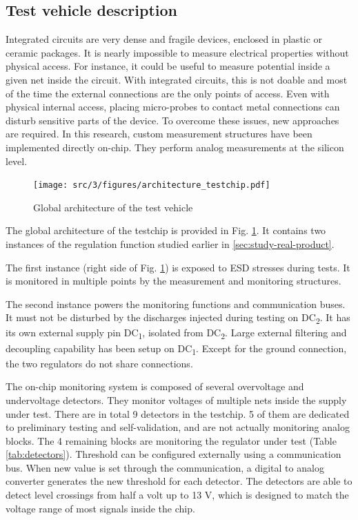 \subsection{Test vehicle description}
\label{sec:test-vehicle-desc}

Integrated circuits are very dense and fragile devices, enclosed in plastic or ceramic packages.
It is nearly impossible to measure electrical properties without physical access.
For instance, it could be useful to measure potential inside a given net inside the circuit.
With integrated circuits, this is not doable and most of the time the external connections are the only points of access.
Even with physical internal access, placing micro-probes to contact metal connections can disturb sensitive parts of the device.
To overcome these issues, new approaches are required.
In this research, custom measurement structures have been implemented directly on-chip.
They perform analog measurements at the silicon level.

\begin{figure}[h]
  \centering
  \texttt{[image: src/3/figures/architecture\_testchip.pdf]}
  \caption{Global architecture of the test vehicle}
  \label{architecture_testchip}
\end{figure}

The global architecture of the testchip is provided in Fig. \ref{architecture_testchip}.
It contains two instances of the regulation function studied earlier in \ref{sec:study-real-product}.

The first instance (right side of Fig. \ref{architecture_testchip}) is exposed to \gls{ESD} stresses during tests.
It is monitored in multiple points by the measurement and monitoring structures.

The second instance powers the monitoring functions and communication buses.
It must not be disturbed by the discharges injected during testing on DC\textsubscript{2}.
It has its own external supply pin DC\textsubscript{1}, isolated from DC\textsubscript{2}.
Large external filtering and decoupling capability has been setup on DC\textsubscript{1}.
Except for the ground connection, the two regulators do not share connections.

The on-chip monitoring system is composed of several overvoltage and undervoltage detectors.
They monitor voltages of multiple nets inside the supply under test.
There are in total 9 detectors in the testchip.
5 of them are dedicated to preliminary testing and self-validation, and are not actually monitoring analog blocks.
The 4 remaining blocks are monitoring the regulator under test (Table \ref{tab:detectors}).
Threshold can be configured externally using a communication bus.
When new value is set through the communication, a digital to analog converter generates the new threshold for each detector.
The detectors are able to detect level crossings from half a volt up to 13 V, which is designed to match the voltage range of most signals inside the chip.

